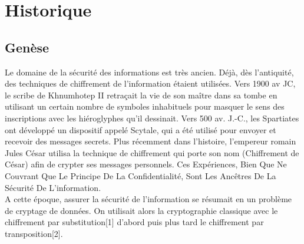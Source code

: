\chapter{Historique}

\section{Genèse}
Le domaine de la sécurité des informations est très ancien. Déjà, dès l’antiquité, des techniques de chiffrement de l’information étaient utilisées. Vers 1900 av JC, le scribe de Khnumhotep II retraçait la vie de son maître dans sa tombe en utilisant un certain nombre de symboles inhabituels pour masquer le sens des inscriptions avec les hiéroglyphes qu’il dessinait. Vers 500 av. J.-C., les Spartiates ont développé un dispositif appelé Scytale, qui a été utilisé pour envoyer et recevoir des messages secrets. Plus récemment dans l’histoire, l’empereur romain Jules César utilisa la technique de chiffrement qui porte son nom (Chiffrement de César) afin de crypter ses messages personnels. Ces Expériences, Bien Que Ne Couvrant Que Le Principe De La Confidentialité, Sont Les Ancêtres De La Sécurité De L’information.\\
A cette époque, assurer la sécurité de l’information se résumait en un problème de cryptage de données. On utilisait alors la cryptographie classique avec le chiffrement par substitution[1] d’abord  puis plus tard le chiffrement par transposition[2].

